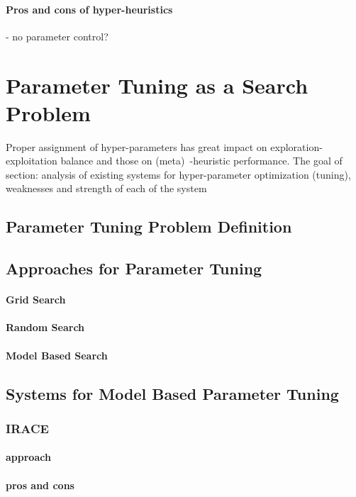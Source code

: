 \paragraph{Pros and cons of hyper-heuristics} - no parameter control?


\section{Parameter Tuning as a Search Problem}\label{bg: parameter tuning}
Proper assignment of hyper-parameters has great impact on exploration-exploitation balance and those on (meta)~-heuristic performance. 
The goal of section: analysis of existing systems for hyper-parameter optimization (tuning), weaknesses and strength of each of the system

\subsection{Parameter Tuning Problem Definition}
\subsection{Approaches for Parameter Tuning}
\paragraph{Grid Search}
\paragraph{Random Search}
\paragraph{Model Based Search}

\subsection{Systems for Model Based Parameter Tuning}\label{bg: parameter tuning expamples}

\subsubsection{IRACE}
\paragraph{approach} \cite{irace:lopez2016irace}
\paragraph{pros and cons}

